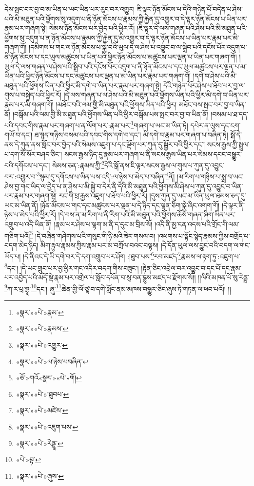 དེས་སྤང་བར་བྱ་བ་མ་ཡིན་པ་ཡང་ཡིན་པར་རུང་བར་འགྱུར། ཇི་ལྟར་ཉོན་མོངས་པ་དེའི་གཉེན་པོ་བདེན་པ་ཤེས་པའི་མི་མཐུན་པའི་ཕྱོགས་སུ་འདུག་པ་ནི་ཉོན་མོངས་པ་རྣམས་ཀྱི་རྐྱེན་དུ་འགྱུར་བ་དེ་ལྟར་ཉོན་མོངས་པ་ཡིན་པར་རྣམ་པར་གཞག་སྟེ། སེམས་ཉོན་མོངས་པར་བྱེད་པའི་ཕྱིར་རོ། །ཇི་ལྟར་དེ་ལས་གཞན་པའི་ཤེས་པའི་མི་མཐུན་པའི་ཕྱོགས་སུ་འདུག་པ་ན་ཉོན་མོངས་པ་རྣམས་ཀྱི་རྐྱེན་དུ་མི་འགྱུར་བ་དེ་ལྟར་ཉོན་མོངས་པ་ཡིན་པར་རྣམ་པར་མི་གཞག་གོ། །དམིགས་པ་གང་ལ་ཉོན་མོངས་པ་སྐྱེ་བའི་ཡུལ་དེ་ལ་ཤེས་པ་འབྱུང་བ་ལ་སྒྲིབ་པའི་དངོས་པོར་འདུག་པ་ནི་ཉོན་མོངས་པ་དང་ཡུལ་མཚུངས་པ་ཡིན་པའི་ཕྱིར་ཉོན་མོངས་པ་མཚུངས་པར་ལྡན་པ་ཡིན་པར་གཞག་གོ། །ཡུལ་དེ་ལས་གཞན་ལ་ཤེས་པའི་སྒྲིབ་པའི་དངོས་པོར་འདུག་པ་ནི་ཉོན་མོངས་པ་དང་ཡུལ་མཚུངས་པར་ལྡན་པ་མ་ཡིན་པའི་ཕྱིར་ཉོན་མོངས་པ་དང་མཚུངས་པར་ལྡན་པ་མ་ཡིན་པར་རྣམ་པར་གཞག་གོ། །དགེ་བ་ཤེས་པའི་མི་མཐུན་པའི་ཕྱོགས་ཡིན་པའི་ཕྱིར་མི་དགེ་བ་ཡིན་པར་རྣམ་པར་གཞག་སྟེ། དེའི་གཉེན་པོར་ཤེས་པ་ཐོབ་པར་བྱ་ལ་གུས་པ་བསྐྱེད་པའི་ཕྱིར་རོ། །དེ་ལས་གཞན་པ་ལ་ཤེས་པའི་མི་མཐུན་པའི་ཕྱོགས་ཡིན་པའི་ཕྱིར་མི་དགེ་བ་ཡིན་པར་རྣམ་པར་མི་གཞག་གོ། །མཐོང་བའི་ལམ་གྱི་མི་མཐུན་པའི་ཕྱོགས་ཡིན་པའི་ཕྱིར། མཐོང་བས་སྤང་བར་བྱ་བ་ཡིན་ནོ། །བསྒོམ་པའི་ལམ་གྱི་མི་མཐུན་པའི་ཕྱོགས་ཡིན་པའི་ཕྱིར་བསྒོམ་པས་སྤང་བར་བྱ་བ་ཡིན་ནོ། །བསམ་པ་ཐ་དད་པའི་དབང་གིས་རྣམ་པར་གཞག་པ་ན་ལོག་པར་:རྣམ་པར་\footnote{«སྣར་»«པེ་»རྣམ་}གཞག་པ་ཡང་མ་ཡིན་ཏེ། དཔེར་ན་ལུས་དང་ངག་གཡོ་བ་དང་། ཐ་སྙད་གཉིས་བསམ་པའི་དབང་གིས་དགེ་བ་དང་། མི་དགེ་བ་རྣམ་པར་གཞག་པ་བཞིན་ཏེ། སྒོ་དེ་ནས་དེ་ཀུན་ནས་སློང་བར་བྱེད་པའི་སེམས་འཇུག་པ་དང་ལྡོག་པར་ཀུན་དུ་སྦྱོར་བའི་ཕྱིར་དང་། སངས་རྒྱས་ཀྱི་སྤྲུལ་པ་དག་སོ་སོར་བཤད་ཅིང་། སངས་རྒྱས་ཉིད་དུ་རྣམ་པར་གཞག་པ་ནི་སངས་རྒྱས་ཡིན་པར་སེམས་དབང་བསྒྱུར་བའི་དགོངས་པ་དང་། སེམས་ཅན་:རྣམས་ཀྱི་\footnote{«སྣར་»«པེ་»རྣམས་}དེའི་སྒོ་ནས་ཇི་ལྟར་སངས་རྒྱས་ལ་གུས་པ་ཀུན་དུ་འབྱུང་བར་:འགྱུར་བ་\footnote{«སྣར་»«པེ་»འགྱུར་}སྙམ་དུ་དགོངས་པ་ཡིན་པས་འདི་:ལ་ཉེས་པ་མེད་པ་བཞིན་\footnote{«སྣར་»«པེ་»ལ་ཉེས་པབཞིན་}ནོ། །མ་རིག་པ་གཉིས་པ་སྨྲ་བ་ཡང་ཤེས་བྱ་གང་ཡིད་ལ་བྱེད་པ་ན་ཤེས་པ་མི་སྐྱེ་བ་དེར་ནི་དེའི་མི་མཐུན་པའི་ཕྱོགས་མི་ཤེས་པ་ཀུན་དུ་འབྱུང་བ་ཡིན་པར་རྣམ་པར་གཞག་སྟེ། རང་གི་ཕྲ་རྒྱས་འཇུག་པ་ཐོབ་པའི་ཕྱིར་རོ། །དུས་ཀུན་དུ་ཡང་མ་ཡིན་ཡུལ་ཐམས་ཅད་དུ་ཡང་མ་ཡིན་ནོ། །ཉོན་མོངས་པ་གང་དང་མཚུངས་པར་ལྡན་པ་དེ་ཉིད་དང་ལྷན་ཅིག་སྐྱེ་ཞིང་འགག་གོ། །དེ་ལྟར་ནི་ཉེས་པ་མེད་པའི་ཕྱིར་རོ། །དེ་བས་ན་མ་རིག་པ་ནི་རིག་པའི་མི་མཐུན་པའི་ཕྱོགས་ཆོས་གཞན་ཞིག་ཡིན་པར་འགྲུབ་པ་འདི་ཡིན་ནོ། །རྣམ་པར་ཤེས་པ་ལྷག་མ་ནི་ད་དུང་མ་བྲིས་སོ། །འདི་ནི་མྱ་ངན་འདས་པའི་གྲོང་གི་ལམ་གཅིག་པའོ།\footnote{«ཅོ་»གའོ«སྣར་»«པེ་»གོ།} །དེ་བཞིན་གཤེགས་པའི་གསུང་གི་ཉི་མའི་ཟེར་གསལ་བ། །འཕགས་པ་སྟོང་སྙེད་རྣམས་ཀྱིས་བགྲོད་པ་བདག་མེད་ཉིད། མིག་རྟུལ་རྣམས་ཀྱིས་རྣམ་པར་མ་བཀྲོལ་བའང་བལྟས། །དེ་དོན་ཡུལ་ལས་བྱུང་བའི་བདག་ལ་གང་ཡོད་པ། །དེ་ནིའང་དེ་ཡི་དགེ་བར་དེ་དག་འགྲུབ་པར་ཤོག :།ཐུབ་པས་\footnote{«སྣར་»«པེ་»།ཐུབཔ་}རབ་མཛད་\footnote{«སྣར་»«པེ་»མཛེས་}རྣམས་ལ་རྟག་ཏུ་:འཇུག་པ་\footnote{«སྣར་»«པེ་»འཇུག་པས་}དང་། །དེ་ཡང་གྲུབ་པར་བྱ་ཕྱིར་གང་འདིར་བདག་གིས་བཟུང་། །རྟེན་ཅིང་འབྲེལ་བར་འབྱུང་བ་དང་པོ་དང་རྣམ་པར་འབྱེད་པའི་མདོ་སྡེ་རྣམ་པར་འགྲེལ་པ་སློབ་དཔོན་བ་སུ་བན་དྷུས་མཛད་པ་རྫོགས་སོ།། །།ལིའི་མཁན་པོ་སུ་རེནྡྲ་\footnote{«སྣར་»«པེ་»རེནྡྲཱ་}ཀ་ར་པྲ་བྷཱ་\footnote{«པེ་»བྷ་}དང་། ཞུ་\footnote{«སྣར་»«པེ་»ཞུས་}ཆེན་གྱི་ལོ་ཙཱ་བ་དགེ་སློང་ནམ་མཁས་བསྒྱུར་ཅིང་ཞུས་ཏེ་གཏན་ལ་ཕབ་པའོ།། །།